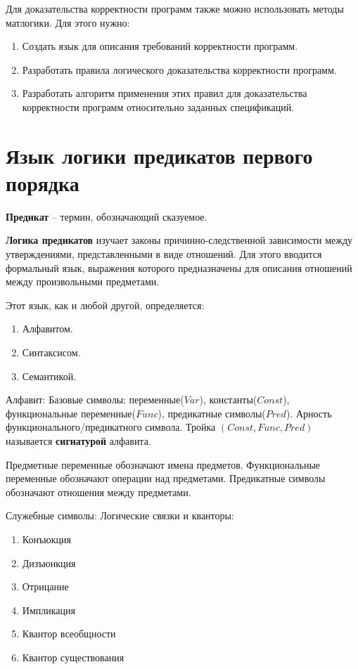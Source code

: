 \documentclass[11pt]{article}
\begin{document}
Для доказательства корректности программ также можно использовать методы матлогики. Для этого нужно:
\begin{enumerate}
\item Создать язык для описания требований корректности программ.
\item Разработать правила логического доказательства корректности программ.
\item Разработать алгоритм применения этих правил для доказательства корректности программ относительно заданных спецификаций.
\end{enumerate}

\section{Язык логики предикатов первого порядка}
\label{sec:org974499a}
\textbf{Предикат} -- термин, обозначающий сказуемое.

\textbf{Логика предикатов} изучает законы причинно-следственной зависимости между утверждениями, представленными в виде отношений. Для этого вводится формальный язык, выражения которого предназначены для описания отношений между произвольными предметами.

Этот язык, как и любой другой, определяется:
\begin{enumerate}
\item Алфавитом.
\item Синтаксисом.
\item Семантикой.
\end{enumerate}

Алфавит:
Базовые символы: переменные(\(Var\)), константы(\(Const\)), функциональные переменные(\(Func\)), предикатные символы(\(Pred\)).
Арность функционального/предикатного символа. Тройка \((Const, Func, Pred)\) называется \textbf{сигнатурой} алфавита.

Предметные переменные обозначают имена предметов. Функциональные переменные обозначают операции над предметами. Предикатные символы обозначают отношения между предметами.

Служебные символы:
Логические связки и кванторы:
\begin{enumerate}
\item Конъюкция
\item Дизъюнкция
\item Отрицание
\item Импликация
\item Квантор всеобщности
\item Квантор существования
\end{enumerate}
\end{document}
